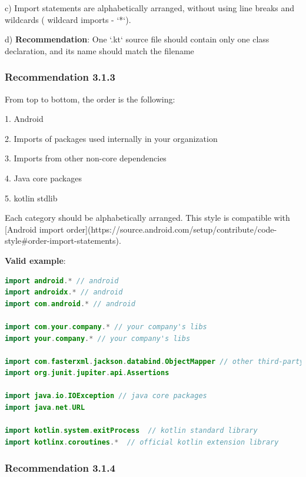 c) Import statements are alphabetically arranged, without using line breaks and wildcards ( wildcard imports - `*`). 



d) \textbf{Recommendation}: One `.kt` source file should contain only one class declaration, and its name should match the filename



\subsubsection*{\textbf{Recommendation 3.1.3}}
\leavevmode\newline



From top to bottom, the order is the following:

1. Android

2. Imports of packages used internally in your organization

3. Imports from other non-core dependencies

4. Java core packages

5. kotlin stdlib



Each category should be alphabetically arranged. This style is compatible with  [Android import order](https://source.android.com/setup/contribute/code-style\#order-import-statements).



\textbf{Valid example}:

\begin{lstlisting}[language=Kotlin]
import android.* // android
import androidx.* // android
import com.android.* // android

import com.your.company.* // your company's libs
import your.company.* // your company's libs

import com.fasterxml.jackson.databind.ObjectMapper // other third-party dependencies
import org.junit.jupiter.api.Assertions

import java.io.IOException // java core packages
import java.net.URL

import kotlin.system.exitProcess  // kotlin standard library
import kotlinx.coroutines.*  // official kotlin extension library
\end{lstlisting}


\subsubsection*{\textbf{Recommendation 3.1.4}}
\leavevmode\newline



